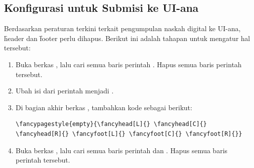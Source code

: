 \subsection{Konfigurasi untuk Submisi ke UI-ana}
\label{sec:uiana}
Berdasarkan peraturan terkini terkait pengumpulan naskah digital ke UI-ana, \f{header} dan \f{footer} perlu dihapus. Berikut ini adalah tahapan untuk mengatur hal tersebut:
\begin{enumerate}
	\item Buka berkas , lalu cari semua baris perintah .
	Hapus semua baris perintah tersebut.
	\item Ubah isi dari perintah  menjadi .
	\item Di bagian akhir berkas , tambahkan kode sebagai berikut:
		\begin{lstlisting}[language={[latex]tex}]
\fancypagestyle{empty}{\fancyhead[L]{} \fancyhead[C]{} \fancyhead[R]{} \fancyfoot[L]{} \fancyfoot[C]{} \fancyfoot[R]{}}
		\end{lstlisting}
    \item Buka berkas , lalu cari semua baris perintah  dan  . Hapus semua baris perintah tersebut.
\end{enumerate}


